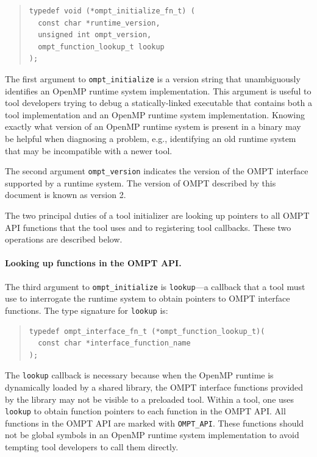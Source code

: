 \documentclass{article}
\begin{document}
\begin{quote}
\begin{verbatim}
typedef void (*ompt_initialize_fn_t) (
  const char *runtime_version, 
  unsigned int ompt_version,
  ompt_function_lookup_t lookup 
);
\end{verbatim}
\end{quote}
The first argument to  \verb|ompt_initialize| is a version string that unambiguously identifies an OpenMP runtime system implementation. This argument is useful to tool developers trying to debug a statically-linked executable that contains both a tool implementation and an OpenMP runtime system implementation. Knowing exactly what version of an OpenMP runtime system is present in a binary may be helpful when diagnosing a problem, e.g., identifying an old runtime system that may be incompatible with a newer tool.

The second argument \verb|ompt_version| indicates the version of the OMPT interface supported by a runtime system.
The version of OMPT described by this document is known as version 2.

The two principal duties of a tool initializer are looking up pointers to all OMPT API functions that the tool uses and to registering tool callbacks.  These two operations are described below.

\paragraph{Looking up functions in the OMPT API.} The third argument to \verb|ompt_initialize| is \verb|lookup|---a callback that a tool must use to interrogate the runtime system to obtain pointers to OMPT interface functions.
The type signature for  \verb|lookup| is:

\begin{quote}
\begin{verbatim}
typedef ompt_interface_fn_t (*ompt_function_lookup_t)(
  const char *interface_function_name
);
\end{verbatim}
\end{quote}

\noindent
The \verb|lookup| callback is necessary because when the OpenMP runtime is dynamically loaded by a shared library, the OMPT interface functions provided by the library may not be visible to a preloaded tool. Within a tool, one uses \verb|lookup| to obtain function pointers to each function in the OMPT API.  All functions in the OMPT API are marked with \verb|OMPT_API|. These functions should not be global symbols in an OpenMP runtime system implementation to avoid tempting tool developers to call them directly. 
\end{document}
